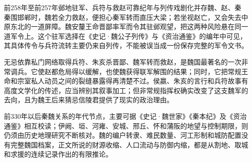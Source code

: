 \begin{event}{前258年至前257年}{邺地驻军、兵符与救赵}{可靠纪年与列传戏剧化并存}{魏、赵、秦}
秦围邯郸时，魏若全力救赵，便担心秦军转而直压大梁；若坐视赵亡，又会失去中原东北的一道屏障。魏安釐王命晋鄙率军而令其驻邺观望，把这两种风险悬在同一道军令上。这个驻军选择在《史记·魏公子列传》与《资治通鉴》的编年中可见，其具体传令与兵符流转主要仍来自列传，不能被误当成一份保存完整的军令文书。

无忌依靠私门网络取得兵符、朱亥杀晋鄙、魏军转而救赵，是魏国最著名的一次非常调兵。它使赵都危局得以缓解，也使魏获得联军解围的结果；同时，它把常规王命和宗室私人动员之间的裂缝暴露得再清楚不过。侯嬴、朱亥的言行和兵符故事有高度文学化的传述，应当辨别其叙事加工；但非常规指挥权确实改变了这支魏军的去向，且为魏王后来猜忌信陵君提供了现实的政治理由。
\end{event}

\begin{sourcenote}
前330年以后秦魏关系的年代节点，主要可据《史记·魏世家》《秦本纪》及《资治通鉴》相互校读；伊阙、垣、河雍、安城、邢丘、怀和蒲阪的地望与控制期限，则仍须由历史地理研究不断核对。魏的编户转隶、难民数量、河工形制和城防配置没有完整魏国档案，正文所说的财源收缩、人口流动与防御内缩，都是从割地、取城和求援的连续记录作出的有限推论。
\end{sourcenote}

